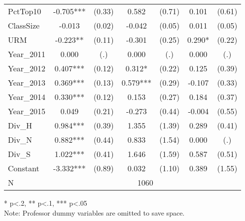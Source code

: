 \begin{sidewaystable}[htb]
\begin{threeparttable}
\begin{tabular}{l|c|c|c|c|c|c}
      PctTop10          & -0.705***                    & (0.33)                       & 0.582                & (0.71)               & 0.101                & (0.61)               \\
      ClassSize         & -0.013                       & (0.02)                       & -0.042               & (0.05)               & 0.011                & (0.05)               \\
      URM               & -0.223**                     & (0.11)                       & -0.301               & (0.25)               & 0.290*               & (0.22)               \\
      Year\_2011        & 0.000                        & (.)                          & 0.000                & (.)                  & 0.000                & (.)                  \\
      Year\_2012        & 0.407***                     & (0.12)                       & 0.312*               & (0.22)               & 0.125                & (0.39)               \\
      Year\_2013        & 0.369***                     & (0.13)                       & 0.579***             & (0.29)               & -0.107               & (0.33)               \\
      Year\_2014        & 0.330***                     & (0.12)                       & 0.153                & (0.27)               & 0.184                & (0.37)               \\
      Year\_2015        & 0.049                        & (0.21)                       & -0.273               & (0.44)               & -0.004               & (0.55)               \\
      Div\_H            & 0.984***                     & (0.39)                       & 1.355                & (1.39)               & 0.289                & (0.41)               \\
      Div\_N            & 0.882***                     & (0.44)                       & 0.833                & (1.54)               & 0.000                & (.)                  \\
      Div\_S            & 1.022***                     & (0.41)                       & 1.646                & (1.59)               & 0.587                & (0.51)               \\
      Constant          & -3.332***                    & (0.89)                       & 0.032                & (1.10)               & 0.389                & (1.55)               \\
      \hline
      N & \multicolumn{6}{|c}{1060} \\
      \hline
      \hline
    \end{tabular}
    \begin{tablenotes}
    \item{* p<.2, ** p<.1, *** p<.05 \\ Note: Professor dummy variables are omitted to save space.}
    \end{tablenotes}
  \end{threeparttable}
\end{sidewaystable}

